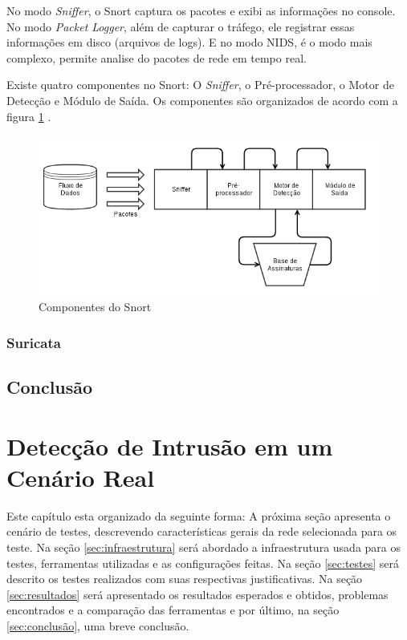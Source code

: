 \documentclass[
	12pt,				
	openright,		
	twoside,	
	a4paper,
	english,	
	brazil	
	]{abntex2}
\begin{document}
 No modo \textit{Sniffer}, o Snort captura os pacotes e exibi as informações no console. No modo \textit{Packet Logger}, além de capturar o tráfego, ele registrar essas informações em disco (arquivos de logs). E no modo NIDS, é o modo mais complexo, permite analise do pacotes de rede em tempo real.

 Existe quatro componentes no Snort: O \textit{Sniffer}, o Pré-processador, o Motor de Detecção e Módulo de Saída. Os componentes são organizados de acordo com a figura \ref{snort-componentes} \cite{kohlenberg2007snort}.

 \begin{figure}[!htb]
   \centering
   \includegraphics[scale=0.6]{snort_componentes}
   \caption{Componentes do Snort}
   \label{snort-componentes}
 \end{figure}

 \subsection{Suricata}
 \section{Conclusão}

 \chapter{Detecção de Intrusão em um Cenário Real}

 Este capítulo esta organizado da seguinte forma: A próxima seção apresenta o cenário de testes, descrevendo características gerais da rede selecionada para os teste. Na seção \ref{sec:infraestrutura} será abordado a infraestrutura usada para os testes, ferramentas utilizadas e as configurações feitas. Na seção \ref{sec:testes} será descrito os testes realizados com suas respectivas justificativas. Na seção \ref{sec:resultados} será apresentado os resultados esperados e obtidos, problemas encontrados e a comparação das ferramentas e por último, na seção \ref{sec:conclusão}, uma breve conclusão.
\end{document}
